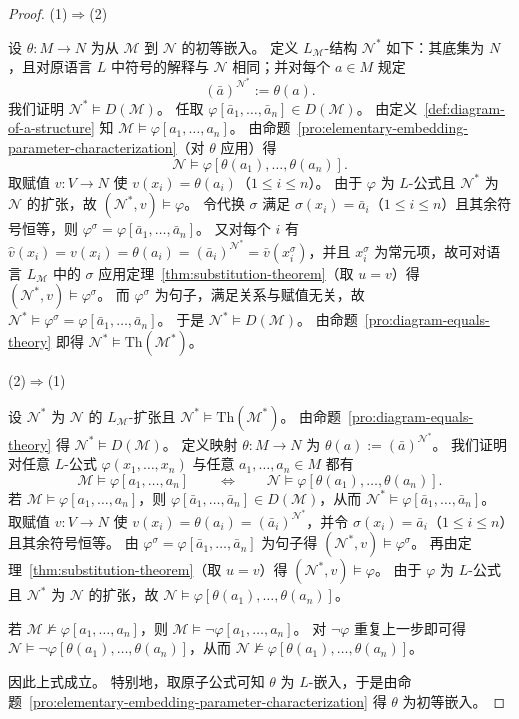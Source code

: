 \documentclass[lang=cn,a4paper,newtx,section]{elegantbook}
\begin{document}
\begin{proof}
 (1)$\Rightarrow$(2)

设 $\theta:M\to N$ 为从 $\mathcal M$ 到 $\mathcal N$ 的初等嵌入。
定义 $L_{\mathcal M}$-结构 $\mathcal N^*$ 如下：其底集为 $N$，且对原语言 $L$ 中符号的解释与 $\mathcal N$ 相同；并对每个 $a\in M$ 规定
\[
  (\bar a)^{\mathcal N^*}:=\theta(a).
\]
我们证明 $\mathcal N^*\models D(\mathcal M)$。
任取 $\varphi[\bar a_1,\dots,\bar a_n]\in D(\mathcal M)$。
由定义~\ref{def:diagram-of-a-structure} 知 $\mathcal M\models\varphi[a_1,\dots,a_n]$。
由命题~\ref{pro:elementary-embedding-parameter-characterization}（对 $\theta$ 应用）得
\[
  \mathcal N\models\varphi[\theta(a_1),\dots,\theta(a_n)].
\]
取赋值 $v:V\to N$ 使 $v(x_i)=\theta(a_i)$（$1\le i\le n$）。
由于 $\varphi$ 为 $L$-公式且 $\mathcal N^*$ 为 $\mathcal N$ 的扩张，故 $(\mathcal N^*,v)\models\varphi$。
令代换 $\sigma$ 满足 $\sigma(x_i)=\bar a_i$（$1\le i\le n$）且其余符号恒等，则 $\varphi^{\sigma}=\varphi[\bar a_1,\dots,\bar a_n]$。
又对每个 $i$ 有 $\hat v(x_i)=v(x_i)=\theta(a_i)=(\bar a_i)^{\mathcal N^*}=\bar v(x_i^{\sigma})$，并且 $x_i^{\sigma}$ 为常元项，故可对语言 $L_{\mathcal M}$ 中的 $\sigma$ 应用定理~\ref{thm:substitution-theorem}（取 $u=v$）得 $(\mathcal N^*,v)\models\varphi^{\sigma}$。
而 $\varphi^{\sigma}$ 为句子，满足关系与赋值无关，故 $\mathcal N^*\models\varphi^{\sigma}=\varphi[\bar a_1,\dots,\bar a_n]$。
于是 $\mathcal N^*\models D(\mathcal M)$。
由命题~\ref{pro:diagram-equals-theory} 即得 $\mathcal N^*\models\mathrm{Th}(\mathcal M^*)$。

 (2)$\Rightarrow$(1)

设 $\mathcal N^*$ 为 $\mathcal N$ 的 $L_{\mathcal M}$-扩张且 $\mathcal N^*\models\mathrm{Th}(\mathcal M^*)$。
由命题~\ref{pro:diagram-equals-theory} 得 $\mathcal N^*\models D(\mathcal M)$。
定义映射 $\theta:M\to N$ 为 $\theta(a):=(\bar a)^{\mathcal N^*}$。
我们证明对任意 $L$-公式 $\varphi(x_1,\dots,x_n)$ 与任意 $a_1,\dots,a_n\in M$ 都有
\[
  \mathcal M\models\varphi[a_1,\dots,a_n]\qquad\Longleftrightarrow\qquad\mathcal N\models\varphi[\theta(a_1),\dots,\theta(a_n)].
\]
若 $\mathcal M\models\varphi[a_1,\dots,a_n]$，则 $\varphi[\bar a_1,\dots,\bar a_n]\in D(\mathcal M)$，从而 $\mathcal N^*\models\varphi[\bar a_1,\dots,\bar a_n]$。
取赋值 $v:V\to N$ 使 $v(x_i)=\theta(a_i)=(\bar a_i)^{\mathcal N^*}$，并令 $\sigma(x_i)=\bar a_i$（$1\le i\le n$）且其余符号恒等。
由 $\varphi^{\sigma}=\varphi[\bar a_1,\dots,\bar a_n]$ 为句子得 $(\mathcal N^*,v)\models\varphi^{\sigma}$。
再由定理~\ref{thm:substitution-theorem}（取 $u=v$）得 $(\mathcal N^*,v)\models\varphi$。
由于 $\varphi$ 为 $L$-公式且 $\mathcal N^*$ 为 $\mathcal N$ 的扩张，故 $\mathcal N\models\varphi[\theta(a_1),\dots,\theta(a_n)]$。

若 $\mathcal M\not\models\varphi[a_1,\dots,a_n]$，则 $\mathcal M\models\neg\varphi[a_1,\dots,a_n]$。
对 $\neg\varphi$ 重复上一步即可得 $\mathcal N\models\neg\varphi[\theta(a_1),\dots,\theta(a_n)]$，从而 $\mathcal N\not\models\varphi[\theta(a_1),\dots,\theta(a_n)]$。

因此上式成立。
特别地，取原子公式可知 $\theta$ 为 $L$-嵌入，于是由命题~\ref{pro:elementary-embedding-parameter-characterization} 得 $\theta$ 为初等嵌入。
\end{proof}
\end{document}
